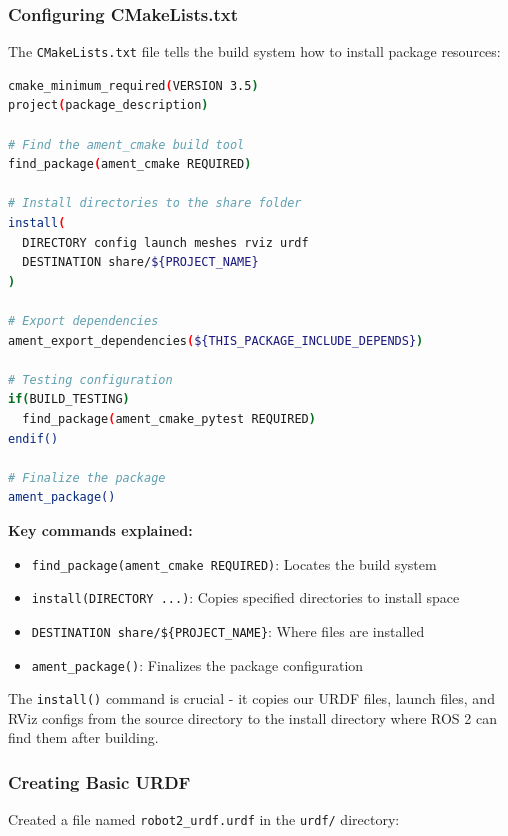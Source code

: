 \subsubsection{Configuring CMakeLists.txt}

The \texttt{CMakeLists.txt} file tells the build system how to install package resources:

\begin{lstlisting}[language=bash]
cmake_minimum_required(VERSION 3.5)
project(package_description)

# Find the ament_cmake build tool
find_package(ament_cmake REQUIRED)

# Install directories to the share folder
install(
  DIRECTORY config launch meshes rviz urdf 
  DESTINATION share/${PROJECT_NAME}
)

# Export dependencies
ament_export_dependencies(${THIS_PACKAGE_INCLUDE_DEPENDS})

# Testing configuration
if(BUILD_TESTING)
  find_package(ament_cmake_pytest REQUIRED)
endif()

# Finalize the package
ament_package()
\end{lstlisting}

\textbf{Key commands explained:}
\begin{itemize}
	\item \texttt{find\_package(ament\_cmake REQUIRED)}: Locates the build system
	\item \texttt{install(DIRECTORY ...)}: Copies specified directories to install space
	\item \texttt{DESTINATION share/\$\{PROJECT\_NAME\}}: Where files are installed
	\item \texttt{ament\_package()}: Finalizes the package configuration
\end{itemize}

The \texttt{install()} command is crucial - it copies our URDF files, launch files, and RViz configs from the source directory to the install directory where ROS 2 can find them after building.

\subsubsection{Creating Basic URDF}

Created a file named \texttt{robot2\_urdf.urdf} in the \texttt{urdf/} directory:

